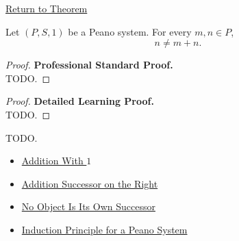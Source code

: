 \newpage
{}
\label{prf:no-natural-number-equals-itself-plus-a-natural-number}

\begin{remark*}[Return]
\hyperref[thm:no-natural-number-equals-itself-plus-a-natural-number]{Return to Theorem}
\end{remark*}

\begin{theorem*}
Let $(P,S,1)$ be a Peano system. For every $m,n \in P$,
\[
n \neq m+n.
\]
\end{theorem*}

\begin{proof}
\textbf{Professional Standard Proof.}~\\
TODO.
\end{proof}

\begin{proof}
\textbf{Detailed Learning Proof.}~\\
TODO.
\end{proof}

\begin{remark*}
TODO.
\end{remark*}

\begin{dependencies}
\begin{itemize}
  \item \hyperref[thm:addition-with-one]{Addition With $1$}
  \item \hyperref[thm:addition-successor-on-right]{Addition Successor on the Right}
  \item \hyperref[thm:no-object-is-its-own-successor]{No Object Is Its Own Successor}
  \item \hyperref[thm:induction-principle-for-peano-system]{Induction Principle for a Peano System}
\end{itemize}
\end{dependencies}